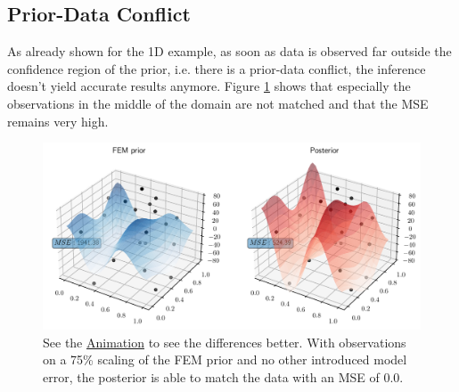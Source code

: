 \documentclass[%
  a4paper,oneside,%
  11pt,%
  smallchapters,
  style=printdev,
  extramargin,
  green,%
  rgb, <cmyk>
  ]{tubsbook}
\begin{document}
\subsection{Prior-Data Conflict}
As already shown for the 1D example, as soon as data is observed far outside the confidence region of the prior, i.e. there is a prior-data conflict, the inference doesn't yield accurate results anymore. Figure \ref{fig:3dPriorDataConf} shows that especially the observations in the middle of the domain are not matched and that the MSE remains very high.
%
\begin{figure}[!ht]
\includegraphics[width=1\textwidth]{../../Python/Results/2D/prior_data_conflict/3dMSE.pdf}
\centering
\caption{See the \href{https://github.com/herluc/herluc.github.io/blob/main/3DMSE.gif}{Animation} to see the differences better. With observations on a 75\% scaling of the FEM prior and no other introduced model error, the posterior is able to match the data with an MSE of $0.0$. }
\label{fig:3dPriorDataConf}
\end{figure}
\end{document}
